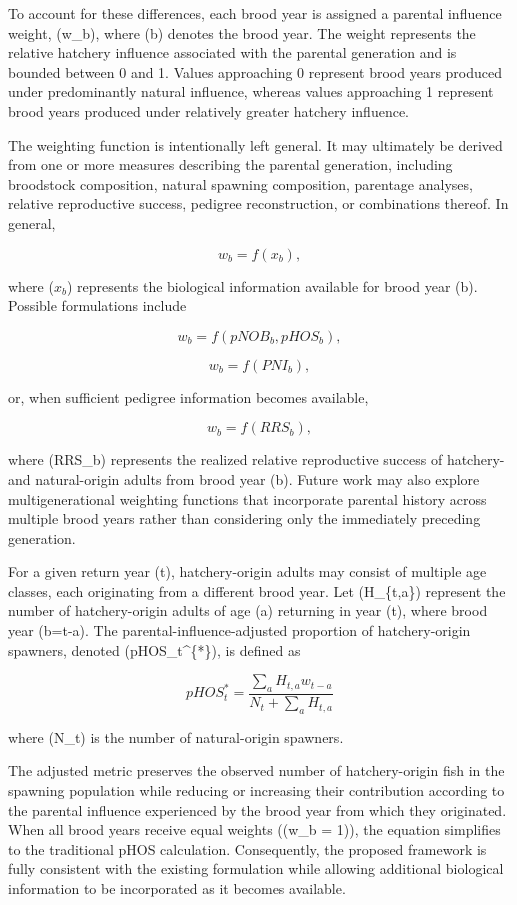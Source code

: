 \documentclass[12pt,letterpaper]{article}
\begin{document}
To account for these differences, each brood year is assigned a parental influence weight, (w\_b), where (b) denotes the brood year. The weight represents the relative hatchery influence associated with the parental generation and is bounded between 0 and 1. Values approaching 0 represent brood years produced under predominantly natural influence, whereas values approaching 1 represent brood years produced under relatively greater hatchery influence.

The weighting function is intentionally left general. It may ultimately be derived from one or more measures describing the parental generation, including broodstock composition, natural spawning composition, parentage analyses, relative reproductive success, pedigree reconstruction, or combinations thereof. In general,

\[
w_b=f(x_b),
\]

where (\(x_b\)) represents the biological information available for brood year (b). Possible formulations include

\[
w_b=f(pNOB_b,pHOS_b),
\]

\[
w_b=f(PNI_b),
\]

or, when sufficient pedigree information becomes available,

\[
w_b=f(RRS_b),
\]

where (RRS\_b) represents the realized relative reproductive success of hatchery- and natural-origin adults from brood year (b). Future work may also explore multigenerational weighting functions that incorporate parental history across multiple brood years rather than considering only the immediately preceding generation.

For a given return year (t), hatchery-origin adults may consist of multiple age classes, each originating from a different brood year. Let (H\_\{t,a\}) represent the number of hatchery-origin adults of age (a) returning in year (t), where brood year (b=t-a). The parental-influence-adjusted proportion of hatchery-origin spawners, denoted (pHOS\_t\^{}\{*\}), is defined as

\[
pHOS_t^{*} =
\frac{
\sum_a H_{t,a}w_{t-a}
}
{
N_t+\sum_a H_{t,a}
}
\]

where (N\_t) is the number of natural-origin spawners.

The adjusted metric preserves the observed number of hatchery-origin fish in the spawning population while reducing or increasing their contribution according to the parental influence experienced by the brood year from which they originated. When all brood years receive equal weights ((w\_b = 1)), the equation simplifies to the traditional pHOS calculation. Consequently, the proposed framework is fully consistent with the existing formulation while allowing additional biological information to be incorporated as it becomes available.
\end{document}
